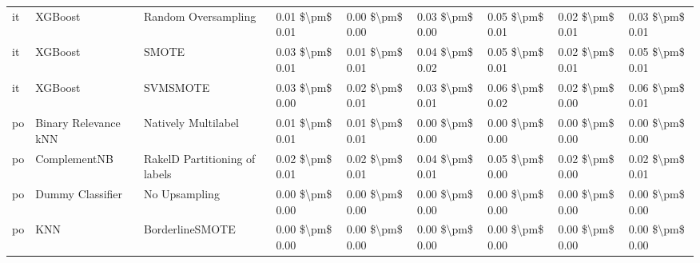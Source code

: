 \begin{tabular}{lllllllll}
      it &                         XGBoost &           Random Oversampling & 0.01 \$\textbackslash pm\$ 0.01 &           0.00 \$\textbackslash pm\$ 0.00 &       0.03 \$\textbackslash pm\$ 0.00 &        0.05 \$\textbackslash pm\$ 0.01 &                         0.02 \$\textbackslash pm\$ 0.01 &     0.03 \$\textbackslash pm\$ 0.01 \\
      it &                         XGBoost &                         SMOTE & 0.03 \$\textbackslash pm\$ 0.01 &           0.01 \$\textbackslash pm\$ 0.01 &       0.04 \$\textbackslash pm\$ 0.02 &        0.05 \$\textbackslash pm\$ 0.01 &                         0.02 \$\textbackslash pm\$ 0.01 &     0.05 \$\textbackslash pm\$ 0.01 \\
      it &                         XGBoost &                      SVMSMOTE & 0.03 \$\textbackslash pm\$ 0.00 &           0.02 \$\textbackslash pm\$ 0.01 &       0.03 \$\textbackslash pm\$ 0.01 &        0.06 \$\textbackslash pm\$ 0.02 &                         0.02 \$\textbackslash pm\$ 0.00 &     0.06 \$\textbackslash pm\$ 0.01 \\
      po &            Binary Relevance kNN &           Natively Multilabel & 0.01 \$\textbackslash pm\$ 0.01 &           0.01 \$\textbackslash pm\$ 0.01 &       0.00 \$\textbackslash pm\$ 0.00 &        0.00 \$\textbackslash pm\$ 0.00 &                         0.00 \$\textbackslash pm\$ 0.00 &     0.00 \$\textbackslash pm\$ 0.00 \\
      po &                    ComplementNB & RakelD Partitioning of labels & 0.02 \$\textbackslash pm\$ 0.01 &           0.02 \$\textbackslash pm\$ 0.01 &       0.04 \$\textbackslash pm\$ 0.01 &        0.05 \$\textbackslash pm\$ 0.00 &                         0.02 \$\textbackslash pm\$ 0.00 &     0.02 \$\textbackslash pm\$ 0.01 \\
      po &                Dummy Classifier &                 No Upsampling & 0.00 \$\textbackslash pm\$ 0.00 &           0.00 \$\textbackslash pm\$ 0.00 &       0.00 \$\textbackslash pm\$ 0.00 &        0.00 \$\textbackslash pm\$ 0.00 &                         0.00 \$\textbackslash pm\$ 0.00 &     0.00 \$\textbackslash pm\$ 0.00 \\
      po &                             KNN &               BorderlineSMOTE & 0.00 \$\textbackslash pm\$ 0.00 &           0.00 \$\textbackslash pm\$ 0.00 &       0.00 \$\textbackslash pm\$ 0.00 &        0.00 \$\textbackslash pm\$ 0.00 &                         0.00 \$\textbackslash pm\$ 0.00 &     0.00 \$\textbackslash pm\$ 0.00 \\

\end{tabular}
